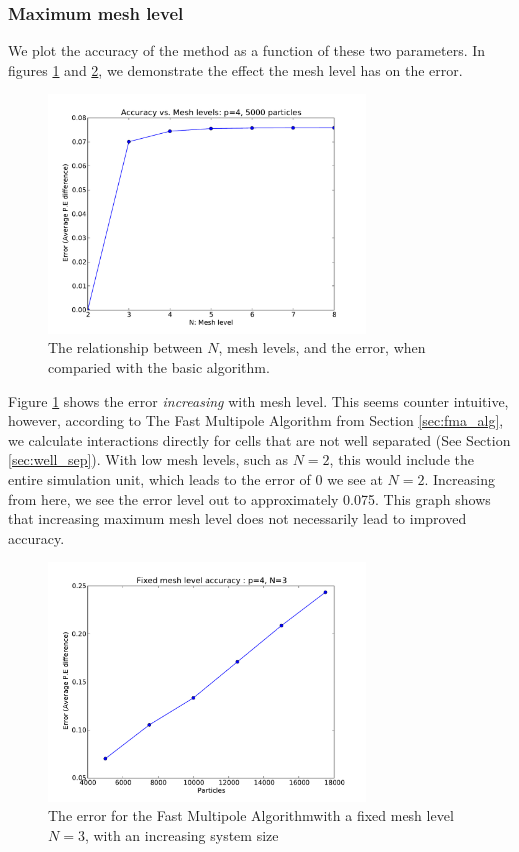 \documentclass[pdftex,twoside,a4paper]{report}
\newcommand{\bcen}{\begin{center}}
\newcommand{\ecen}{\end{center}}
\newcommand{\fma}{Fast Multipole Algorithm}
\begin{document}
\subsubsection{Maximum mesh level}
We plot the accuracy of the method as a function of these two parameters. In figures \ref{fig:fma_mesh_acc} and \ref{fig:fma_fixed_mesh_acc}, we demonstrate the effect the mesh level has on the error. 

\begin{figure}
\bcen \includegraphics[width=0.75\textwidth]{figures/graphs/fma_mesh_acc.pdf} \ecen
\caption{The relationship between $N$, mesh levels, and the error, when comparied with the basic algorithm.}
\label{fig:fma_mesh_acc}
\end{figure}

Figure \ref{fig:fma_mesh_acc} shows the error \emph{increasing} with mesh level. This seems counter intuitive, however, according to The \fma{} from Section \ref{sec:fma_alg}, we calculate interactions directly for cells that are not well separated (See Section \ref{sec:well_sep}). With low mesh levels, such as $N=2$, this would include the entire simulation unit, which leads to the error of 0 we see at $N=2$. Increasing from here, we see the error level out to approximately 0.075. This graph shows that increasing maximum mesh level does not necessarily lead to improved accuracy.

\begin{figure}
\bcen \includegraphics[width=0.75\textwidth]{figures/graphs/fma_fixed_mesh_acc.pdf} \ecen
\caption{The error for the \fma with a fixed mesh level $N=3$, with an increasing system size}
\label{fig:fma_fixed_mesh_acc}
\end{figure}
\end{document}
